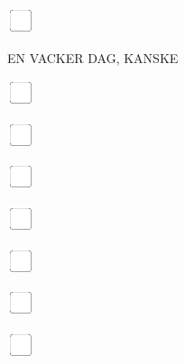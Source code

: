 \documentclass[11pt,titlepage]{article}
\begin{document}
\vspace{10mm}

\noindent
\includegraphics[]{checkbox-4mm.pdf}

\pagebreak

\small
\hfill EN VACKER DAG, KANSKE

\vspace{6mm}

\noindent
\includegraphics[]{checkbox-4mm.pdf}

\vspace{10mm}

\noindent
\includegraphics[]{checkbox-4mm.pdf}

\vspace{10mm}

\noindent
\includegraphics[]{checkbox-4mm.pdf}

\vspace{10mm}

\noindent
\includegraphics[]{checkbox-4mm.pdf}

\vspace{10mm}

\noindent
\includegraphics[]{checkbox-4mm.pdf}

\vspace{10mm}

\noindent
\includegraphics[]{checkbox-4mm.pdf}

\vspace{10mm}

\noindent
\includegraphics[]{checkbox-4mm.pdf}
\end{document}

